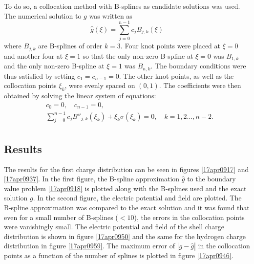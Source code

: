 \documentclass[twocolumn]{article}
\begin{document}
\begin{large}
To do so, a collocation method with B-splines as candidate solutions was used. The numerical solution to $g$ was written as 
\begin{equation}
    \hat{g}(\xi) = \sum_{j=0}^{n-1}c_jB_{j,k}(\xi)
\end{equation}
where $B_{j,k}$ are B-splines of order $k=3$. Four knot points were placed at $\xi=0$ and another four at $\xi=1$ so that the only non-zero B-spline at $\xi=0$ was $B_{1,k}$ and the only non-zero B-spline at $\xi=1$ was $B_{n,k}$. The boundary conditions were thus satisfied by setting $c_1=c_{n-1}=0$. The other knot points, as well as the collocation points $\xi_k$, were evenly spaced on $(0,1)$. The coefficients were then obtained by solving the linear system of equations:
\begin{equation}
    \begin{split}
        &c_0 = 0, \quad c_{n-1} = 0, \\ 
        &\sum_{j=0}^{n-1}c_jB''_{j,k}(\xi_k) + \xi_k\sigma(\xi_k) = 0,\quad k=1,2\dots,n-2. \\ 
    \end{split}
\end{equation}

\subsection*{Results}
The results for the first charge distribution can be seen in figures \ref{17apr0917} and \ref{17apr0937}. In the first figure, the B-spline approximation $\hat{g}$ to the boundary value problem \eqref{17apr0918} is plotted along with the B-splines used and the exact solution $g$. In the second figure, the electric potential and field are plotted. The B-spline approximation was compared to the exact solution and it was found that even for a small number of B-splines ($<10$), the errors in the collocation points were vanishingly small. The electric potential and field of the shell charge distribution is shown in figure \ref{17apr0950} and the same for the hydrogen charge distribution in figure \ref{17apr0959}. The maximum error of $|g-\hat{g}|$ in the collocation points as a function of the number of splines is plotted in figure \ref{17apr0946}.


\end{large}
\end{document}
